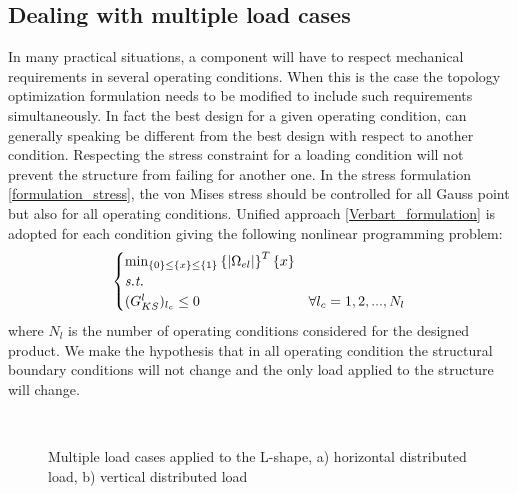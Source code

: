 \subsection{Dealing with multiple load cases}
In many practical situations, a component will have to respect mechanical requirements in several operating conditions. When this is the case the topology optimization formulation needs to be modified to include such requirements simultaneously. In fact the best design for a given operating condition, can generally speaking be different from the best design with respect to another condition. Respecting the stress constraint for a loading condition will not prevent the structure from failing for another one. In the stress formulation \ref{formulation_stress}, the von Mises stress should be controlled for all Gauss point but also for all operating conditions. Unified approach \ref{Verbart_formulation} is adopted for each condition giving the following nonlinear programming problem:
\begin{equation}
\begin{cases}
\min_{\left\lbrace{0}\right \rbrace\leq\left\lbrace{x}\right \rbrace\leq\left\lbrace{1}\right \rbrace} {\left\lbrace{|\Omega_{el}|}\right \rbrace^T\left\lbrace{x}\right \rbrace} \\
\textit{s.t.}\\
(G^{l}_{KS})_{l_c}\leq 0 & \forall l_c=1,2,...,N_l \\
\end{cases}
\end{equation}
where $N_l$ is the number of operating conditions considered for the designed product. We make the hypothesis that in all operating condition the structural boundary conditions will not change and the only load applied to the structure will change. 
\begin{figure}[ht]
\centering
{}%
\quad
{}%
  \\
\caption{Multiple load cases applied to the L-shape, a) horizontal distributed load, b) vertical distributed load}%
\label{fig.2.21}%
\end{figure}
